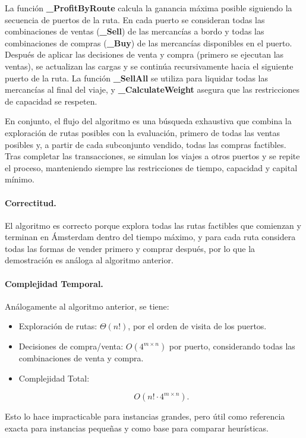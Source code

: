 \documentclass[12pt, a4paper]{article}
\begin{document}
La función \textbf{\_ProfitByRoute} calcula la ganancia máxima posible siguiendo la secuencia de puertos de la ruta. 
En cada puerto se consideran todas las combinaciones de ventas (\textbf{\_Sell}) de las mercancías a bordo y todas las combinaciones de compras (\textbf{\_Buy}) de las mercancías disponibles en el puerto. 
Después de aplicar las decisiones de venta y compra (primero se ejecutan las ventas), se actualizan las cargas y se continúa recursivamente hacia el siguiente puerto de la ruta. 
La función \textbf{\_SellAll} se utiliza para liquidar todas las mercancías al final del viaje, y \textbf{\_CalculateWeight} asegura que las restricciones de capacidad se respeten.

En conjunto, el flujo del algoritmo es una búsqueda exhaustiva que combina la exploración de rutas posibles con la evaluación, primero de todas las ventas posibles y, a partir de cada subconjunto vendido, todas las compras factibles. Tras completar las transacciones, se simulan los viajes a otros puertos y se repite el proceso, manteniendo siempre las restricciones de tiempo, capacidad y capital mínimo.

\paragraph{Correctitud.}
El algoritmo es correcto porque explora todas las rutas factibles que comienzan y terminan en Ámsterdam dentro del tiempo máximo, y para cada ruta considera todas las formas de vender primero y comprar después, por lo que la demostración es análoga al algoritmo anterior.

\paragraph{Complejidad Temporal.}
Análogamente al algoritmo anterior, se tiene:
\begin{itemize}
    \item Exploración de rutas: $\Theta(n!)$, por el orden de visita de los puertos.
    \item Decisiones de compra/venta: $O(4^{m \times n})$ por puerto, considerando todas las combinaciones de venta y compra.
    \item Complejidad Total: 
    

\[
    O(n! \cdot 4^{m \times n}).
    \]


\end{itemize}

Esto lo hace impracticable para instancias grandes, pero útil como referencia exacta para instancias pequeñas y como base para comparar heurísticas.
\end{document}
